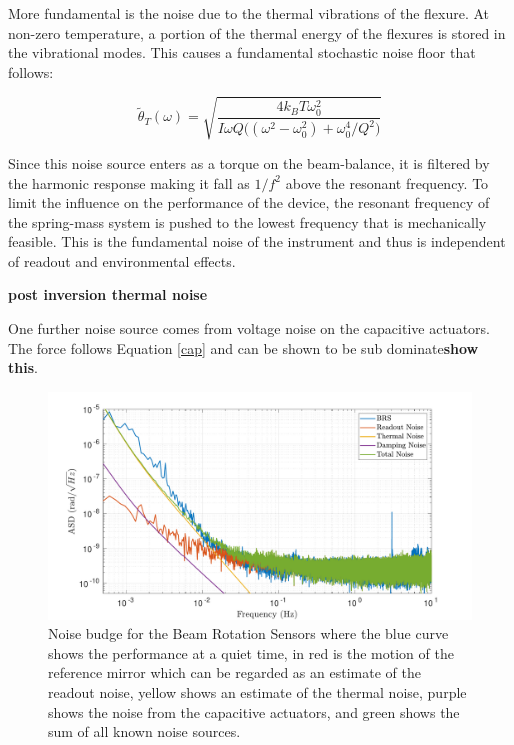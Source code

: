 \documentclass [12pt, proquest]{uwthesis}[2019]
\begin{document}
More fundamental is the noise due to the thermal vibrations of the flexure. At non-zero temperature, a portion of the thermal energy of the flexures is stored in the vibrational modes. This causes a fundamental stochastic noise floor that follows\cite{thermal}:

\begin{equation}
\tilde\theta_T(\omega)=\sqrt{\frac{4 k_B T \omega_0^2}{I \omega Q\big((\omega^2-\omega_0^2)+\omega_0^4/Q^2\big)}}
\end{equation}

Since this noise source enters as a torque on the beam-balance, it is filtered by the harmonic response making it fall as $1/f^2$ above the resonant frequency. To limit the influence on the performance of the device, the resonant frequency of the spring-mass system is pushed to the lowest frequency that is mechanically feasible. This is the fundamental noise of the instrument and thus is independent of readout and environmental effects.


 \textbf{post inversion thermal noise}
 
 One further noise source comes from voltage noise on the capacitive actuators. The force follows Equation \ref{cap} and can be shown to be sub dominate\textbf{show this}.
 
 \begin{figure}%
\begin{center}
\includegraphics[width=\textwidth]{BRSNoiseBudget.pdf}
\caption{Noise budge for the Beam Rotation Sensors where the blue curve shows the performance at a quiet time, in red is the motion of the reference mirror which can be regarded as an estimate of the readout noise, yellow shows an estimate of the thermal noise, purple shows the noise from the capacitive actuators, and green shows the sum of all known noise sources.}
\label{noise}
\end{center}
\end{figure}
\end{document}
